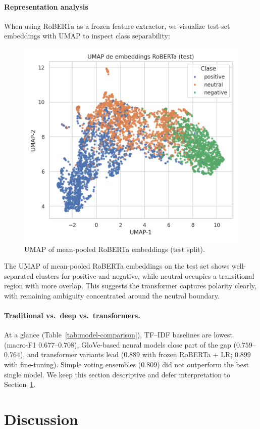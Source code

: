 \documentclass[10pt]{article}
\begin{document}
\paragraph{Representation analysis}
When using RoBERTa as a frozen feature extractor, we visualize test-set embeddings with UMAP to inspect class separability:
\begin{figure}[H]
  \centering
  \includegraphics[width=.75\linewidth]{../SCRITPS/artifacts/figures/roberta_fe_test_umap.png}
  \caption{UMAP of mean-pooled RoBERTa embeddings (test split).}
  \label{fig:umap-roberta}
\end{figure}
The UMAP of mean-pooled RoBERTa embeddings on the test set shows well-separated clusters for positive and negative, while neutral occupies a transitional region with more overlap. This suggests the transformer captures polarity clearly, with remaining ambiguity concentrated around the neutral boundary.

\paragraph{Traditional vs.\ deep vs.\ transformers.}
At a glance (Table~\ref{tab:model-comparison}), TF--IDF baselines are lowest (macro-F1 $0.677$--$0.708$), GloVe-based neural models close part of the gap ($0.759$--$0.764$), and transformer variants lead ($0.889$ with frozen RoBERTa + LR; $0.899$ with fine-tuning). Simple voting ensembles ($0.809$) did not outperform the best single model. We keep this section descriptive and defer interpretation to Section~\ref{sec:discussion}.
\section{Discussion}\label{sec:discussion}
\end{document}
